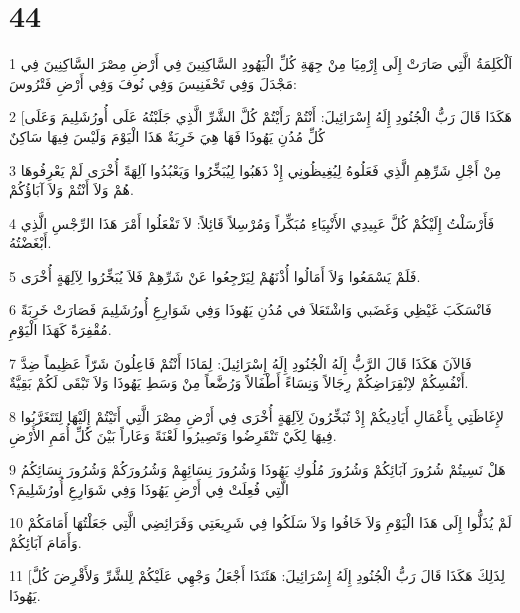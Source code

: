 \chapter{44}

\par 1 اَلْكَلِمَةُ الَّتِي صَارَتْ إِلَى إِرْمِيَا مِنْ جِهَةِ كُلِّ الْيَهُودِ السَّاكِنِينَ فِي أَرْضِ مِصْرَ السَّاكِنِينَ فِي مَجْدَلَ وَفِي تَحْفَنِيسَ وَفِي نُوفَ وَفِي أَرْضِ فَتْرُوسَ:
\par 2 [هَكَذَا قَالَ رَبُّ الْجُنُودِ إِلَهُ إِسْرَائِيلَ: أَنْتُمْ رَأَيْتُمْ كُلَّ الشَّرِّ الَّذِي جَلَبْتُهُ عَلَى أُورُشَلِيمَ وَعَلَى كُلِّ مُدُنِ يَهُوذَا فَهَا هِيَ خَرِبَةٌ هَذَا الْيَوْمَ وَلَيْسَ فِيهَا سَاكِنٌ
\par 3 مِنْ أَجْلِ شَرِّهِمِ الَّذِي فَعَلُوهُ لِيُغِيظُونِي إِذْ ذَهَبُوا لِيُبَخِّرُوا وَيَعْبُدُوا آلِهَةً أُخْرَى لَمْ يَعْرِفُوهَا هُمْ وَلاَ أَنْتُمْ وَلاَ آبَاؤُكُمْ.
\par 4 فَأَرْسَلْتُ إِلَيْكُمْ كُلَّ عَبِيدِي الأَنْبِيَاءِ مُبَكِّراً وَمُرْسِلاً قَائِلاً: لاَ تَفْعَلُوا أَمْرَ هَذَا الرِّجْسِ الَّذِي أَبْغَضْتُهُ.
\par 5 فَلَمْ يَسْمَعُوا وَلاَ أَمَالُوا أُذْنَهُمْ لِيَرْجِعُوا عَنْ شَرِّهِمْ فَلاَ يُبَخِّرُوا لِآلِهَةٍ أُخْرَى.
\par 6 فَانْسَكَبَ غَيْظِي وَغَضَبي وَاشْتَعَلاَ في مُدُنِ يَهُوذَا وَفِي شَوَارِعِ أُورُشَلِيمَ فَصَارَتْ خَرِبَةً مُقْفِرَةً كَهَذَا الْيَوْمِ.
\par 7 فَالآنَ هَكَذَا قَالَ الرَّبُّ إِلَهُ الْجُنُودِ إِلَهُ إِسْرَائِيلَ: لِمَاذَا أَنْتُمْ فَاعِلُونَ شَرّاً عَظِيماً ضِدَّ أَنْفُسِكُمْ لاِنْقِرَاضِكُمْ رِجَالاً وَنِسَاءً أَطْفَالاً وَرُضَّعاً مِنْ وَسَطِ يَهُوذَا وَلاَ تَبْقَى لَكُمْ بَقِيَّةٌ.
\par 8 لإِغَاظَتِي بِأَعْمَالِ أَيَادِيكُمْ إِذْ تُبَخِّرُونَ لِآلِهَةٍ أُخْرَى فِي أَرْضِ مِصْرَ الَّتِي أَتَيْتُمْ إِلَيْهَا لِتَتَغَرَّبُوا فِيهَا لِكَيْ تَنْقَرِضُوا وَتَصِيرُوا لَعْنَةً وَعَاراً بَيْنَ كُلِّ أُمَمِ الأَرْضِ.
\par 9 هَلْ نَسِيتُمْ شُرُورَ آبَائِكُمْ وَشُرُورَ مُلُوكِ يَهُوذَا وَشُرُورَ نِسَائِهِمْ وَشُرُورَكُمْ وَشُرُورَ نِسَائِكُمُ الَّتِي فُعِلَتْ فِي أَرْضِ يَهُوذَا وَفِي شَوَارِعِ أُورُشَلِيمَ؟
\par 10 لَمْ يُذَلُّوا إِلَى هَذَا الْيَوْمِ وَلاَ خَافُوا وَلاَ سَلَكُوا فِي شَرِيعَتِي وَفَرَائِضِي الَّتِي جَعَلْتُهَا أَمَامَكُمْ وَأَمَامَ آبَائِكُمْ.
\par 11 [لِذَلِكَ هَكَذَا قَالَ رَبُّ الْجُنُودِ إِلَهُ إِسْرَائِيلَ: هَئَنَذَا أَجْعَلُ وَجْهِي عَلَيْكُمْ لِلشَّرِّ وَلأَقْرِضَ كُلَّ يَهُوذَا.
